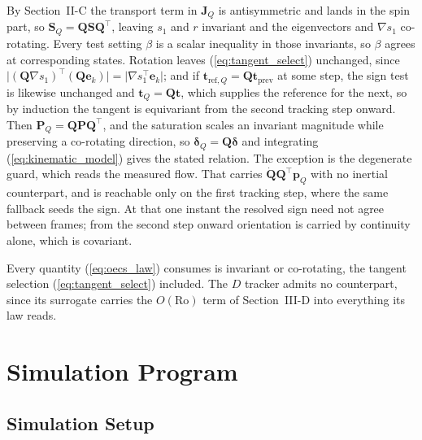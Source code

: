 \documentclass[lettersize,journal]{IEEEtran}
\begin{document}
\begin{IEEEproof}
By Section~\mbox{II-C} the transport term in $\mathbf{J}_Q$ is
antisymmetric and lands in the spin part, so $\mathbf{S}_Q = \mathbf{Q}
\mathbf{S}\mathbf{Q}^\top$, leaving $s_1$ and $r$ invariant and the
eigenvectors and $\nabla s_1$ co-rotating. Every test setting $\beta$ is
a scalar inequality in those invariants, so $\beta$ agrees at
corresponding states. Rotation leaves (\ref{eq:tangent_select})
unchanged, since $\lvert(\mathbf{Q}\nabla s_1)^\top(\mathbf{Q}
\mathbf{e}_k)\rvert = \lvert\nabla s_1^\top\mathbf{e}_k\rvert$; and if
$\mathbf{t}_{\mathrm{ref},Q} = \mathbf{Q}\mathbf{t}_{\mathrm{prev}}$ at
some step, the sign test is likewise unchanged and $\mathbf{t}_Q =
\mathbf{Q}\mathbf{t}$, which supplies the reference for the next, so by
induction the tangent is equivariant from the second tracking step
onward. Then $\mathbf{P}_Q = \mathbf{Q}\mathbf{P}\mathbf{Q}^\top$, and
the saturation scales an invariant magnitude while preserving a
co-rotating direction, so $\boldsymbol{\delta}_Q = \mathbf{Q}
\boldsymbol{\delta}$ and integrating (\ref{eq:kinematic_model}) gives
the stated relation. The exception is the degenerate guard, which reads
the measured flow. That carries $\dot{\mathbf{Q}}\mathbf{Q}^\top
\mathbf{p}_Q$ with no inertial counterpart, and is reachable only on the
first tracking step, where the same fallback seeds the sign. At that one
instant the resolved sign need not agree between frames; from the second
step onward orientation is carried by continuity alone, which is
covariant.
\end{IEEEproof}

Every quantity (\ref{eq:oecs_law}) consumes is invariant or co-rotating,
the tangent selection (\ref{eq:tangent_select}) included. The $D$
tracker admits no counterpart, since its surrogate carries the
$O(\mathrm{Ro})$ term of Section~\mbox{III-D} into everything its law
reads.

\section{Simulation Program}
\label{sec:methods}

\subsection{Simulation Setup}
\end{document}
